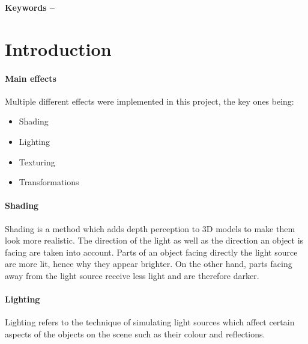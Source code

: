 \documentclass[10pt, a4paper]{article}
\title{\mytitle}
\author{\myauthor\hspace{1em}\\\contact\\Edinburgh Napier University\hspace{0.5em}-\hspace{0.5em}\mymodule}
\date{}
\newcommand{\figuremacro}[5]{
    \begin{figure}[#1]
        \centering
        \texttt{[image: \#2]}
        \caption[#3]{\textbf{#3}#4}
        \label{fig:#2}
    \end{figure}
}
\begin{document}
	\maketitle
	\begin{abstract}
    The aim of this project is to create a 3D scene in OpenGL, using key graphical rendering principles. A renderer framework was used in order to create effects and reduce development time. A number of graphical techniques were implemented such as lighting, texturing, cameras. The resulting scene is a moonlit eerie house, surrounded by dead trees. The inspiration for the project came from the cartoon Courage the Cowardly Dog \cite{courage}.
    \figuremacro{h}{courage.jpg}{Courage the Cowardly Dog}{ \textit{Inspiration for the project} }{1.0}
	\end{abstract}

    \textbf{Keywords -- }{\mykeywords}
    \section{Introduction}
    \paragraph{Main effects}
    Multiple different effects were implemented in this project, the key ones being:
    \begin{itemize}
        \item Shading
        \item Lighting
        \item Texturing
        \item Transformations
    \end{itemize}
    \paragraph{Shading}
    Shading is a method which adds depth perception to 3D models to make them look more realistic. The direction of the light as well as the direction an object is facing are taken into account. Parts of an object facing directly the light source are more lit, hence why they appear brighter. On the other hand, parts facing away from the light source receive less light and are therefore darker.

    \paragraph{Lighting}
    Lighting refers to the technique of simulating light sources which affect certain aspects of the objects on the scene such as their colour and reflections.
\end{document}

